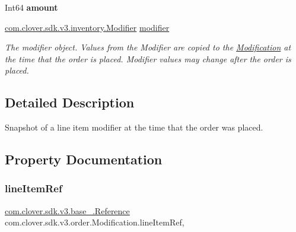 \begin{DoxyCompactItemize}
\item 
\mbox{\label{classcom_1_1clover_1_1sdk_1_1v3_1_1order_1_1_modification_ac845d0ac88478caf23e4c19bcdec2a43}} 
Int64 {\bfseries amount}
\item 
\hyperlink{classcom_1_1clover_1_1sdk_1_1v3_1_1inventory_1_1_modifier}{com.\+clover.\+sdk.\+v3.\+inventory.\+Modifier} \hyperlink{classcom_1_1clover_1_1sdk_1_1v3_1_1order_1_1_modification_a56419d1dc4c9a9c813a1d5a2bc86e9c8}{modifier}
\begin{DoxyCompactList}\small\item\em The modifier object. Values from the Modifier are copied to the \hyperlink{classcom_1_1clover_1_1sdk_1_1v3_1_1order_1_1_modification}{Modification} at the time that the order is placed. Modifier values may change after the order is placed. \end{DoxyCompactList}\end{DoxyCompactItemize}


\subsection{Detailed Description}
Snapshot of a line item modifier at the time that the order was placed. 



\subsection{Property Documentation}
\mbox{\label{classcom_1_1clover_1_1sdk_1_1v3_1_1order_1_1_modification_ae10602350c922aa9befc99465fe86a3f}} 
\subsubsection{\texorpdfstring{line\+Item\+Ref}{lineItemRef}}
{\footnotesize\ttfamily \hyperlink{classcom_1_1clover_1_1sdk_1_1v3_1_1base___1_1_reference}{com.\+clover.\+sdk.\+v3.\+base\+\_\+.\+Reference} com.\+clover.\+sdk.\+v3.\+order.\+Modification.\+line\+Item\+Ref\hspace{0.3cm}{\ttfamily [get]}, {\ttfamily [set]}}




